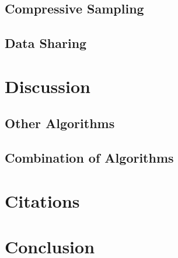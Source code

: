 \subsection{Compressive Sampling}


\subsection{Data Sharing}
\label{sec:Listings}


\section{Discussion}
\label{sec:Discussion}


\subsection{Other Algorithms}
\label{sec:Listings}


\subsection{Combination of Algorithms}
\label{sec:Listings}


\section{Citations}
\label{sec:Citations}


\section{Conclusion}
\label{sec:Conclusion}

